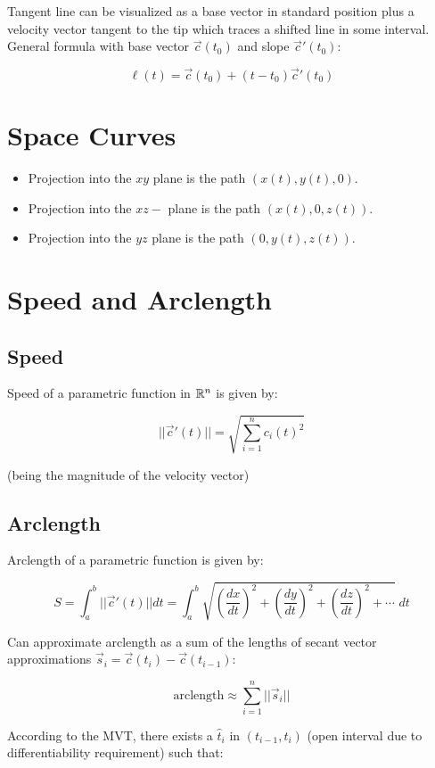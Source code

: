 Tangent line can be visualized as a base vector in standard position plus a velocity vector
tangent to the tip which traces a shifted line in some interval. General formula with base vector $\vec{c}(t_0)$ and slope $\vec{c}'(t_0)$:

\[\boxed{\ell(t)=\vec{c}(t_0)+(t-t_0)\vec{c}'(t_0)}\]

\section{Space Curves}

\begin{itemize}
    \item Projection into the $x y$ plane is the path $(x(t), y(t), 0)$.
    \item Projection into the $x z-$ plane is the path $(x(t), 0, z(t))$.
    \item Projection into the $y z$ plane is the path $(0, y(t), z(t))$.
\end{itemize}

\section{Speed and Arclength}

\subsection{Speed}

Speed of a parametric function in $\mathbb{R}^n$ is given by:

$$||\vec{c}'(t)||=\sqrt{\displaystyle\sum_{i=1}^{n}c_i(t)^2}$$

(being the magnitude of the velocity vector)

\subsection{Arclength}

Arclength of a parametric function is given by:

\[S=\int_a^b ||\vec{c}'(t)||dt=\int_a^b\sqrt{(\frac{dx}{dt})^2+(\frac{dy}{dt})^2+(\frac{dz}{dt})^2+\cdots}\;dt\]

Can approximate arclength as a sum of the lengths of secant vector approximations
$\vec{s}_i=\vec{c}(t_i)-\vec{c}(t_{i-1})$:

\[\mbox{arclength}\approx\sum_{i=1}^n||\vec{s}_i||\]

According to the MVT, there exists a $\hat{t}_i$ in $(t_{i-1},t_i)$ (open interval due to differentiability requirement) such that:

